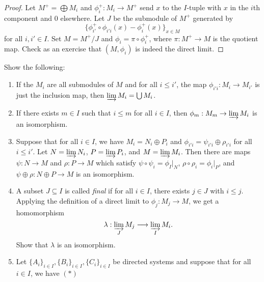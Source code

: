 \begin{proof}
  Let $M^+ = \bigoplus M_i$ and
  $\phi_i^+ : M_i \to M^+$ send
  $x$ to the $I$-tuple with $x$ in the
  $i$th component and $0$ elsewhere. Let
  $J$ be the submodule of $M^+$ generated by
  \[\{\phi_{i'}^+ \circ \phi_{i' i}(x) - \phi_i^+(x)\}_{x \in M}\]
  for all $i, i' \in I$. Set
  $M = M^+ / J$ and
  $\phi_i = \pi \circ \phi_i^+$, where
  $\pi : M^+ \to M$ is the quotient map.
  Check as an exercise that $(M, \phi_i)$ is
  indeed the direct limit.
\end{proof}

\begin{exercise}
  Show the following:
  \begin{enumerate}
    \item If the $M_i$ are all submodules of $M$
      and for all $i \le i'$, the map
      $\phi_{i' i} : M_i \to M_{i'}$ is
      just the inclusion map, then
      $\varinjlim M_i = \bigcup M_i$.
    \item If there exists $m \in I$ such that
      $i \le m$ for all $i \in I$, then
      $\phi_m : M_m \to \varinjlim M_i$ is an
      isomorphism.
    \item Suppose that for all $i \in I$,
      we have $M_i = N_i \oplus P_i$ and
      $\phi_{i' i} = \psi_{i' i} \oplus \rho_{i' i}$
      for all $i \le i'$.
      Let $N = \varinjlim N_i$,
      $P = \varinjlim P_i$, and $M = \varinjlim M_i$.
      Then there are maps
      $\psi : N \to M$ and $\rho : P \to M$
      which satisfy $\psi \circ \psi_i = \phi_I|_N$,
      $\rho \circ \rho_i = \phi_i|_P$, and
      $\psi \oplus \rho : N \oplus P \to M$
      is an isomorphism.
    \item A subset $J \subseteq I$ is called
      \emph{final} if for all $i \in I$,
      there exists $j \in J$ with
      $i \le j$. Applying the definition of
      a direct limit to $\phi_j : M_j \to M$,
      we get a homomorphism
      \[
        \lambda : \varinjlim_J M_j \longrightarrow \varinjlim_I M_i.
      \]
      Show that $\lambda$ is an isomorphism.
    \item Let $\{A_i\}_{i \in I}, \{B_i\}_{i \in I}, \{C_i\}_{i \in I}$ be directed systems
      and suppose that for all $i \in I$, we have $(*)$
      \begin{center}
      \end{center}

\end{enumerate}
\end{exercise}
